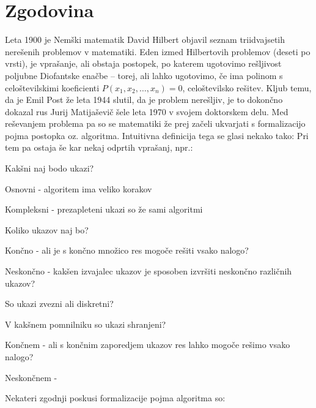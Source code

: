 \documentclass[10pt,a4paper,oneside]{book}
\begin{document}
\section{Zgodovina}
Leta 1900 je Nemški matematik David Hilbert objavil seznam triidvajsetih nerešenih problemov v matematiki. Eden izmed Hilbertovih problemov (deseti po vrsti), je vprašanje, ali obstaja postopek, po katerem ugotovimo rešljivost poljubne Diofantske enačbe -- torej, ali lahko ugotovimo, če ima polinom s celoštevilskimi koeficienti $P(x_1, x_2, \dots, x_n)=0$, celoštevilsko rešitev.
Kljub temu, da je Emil Post že leta 1944 slutil, da je problem nerešljiv, je to dokončno dokazal rus Jurij Matijaševič šele leta 1970 v svojem doktorskem delu. Med reševanjem problema pa so se matematiki že prej začeli ukvarjati s formalizacijo pojma postopka oz. algoritma. Intuitivna definicija tega se glasi nekako tako:
Pri tem pa ostaja še kar nekaj odprtih vprašanj, npr.:
\begin{items}
\item Kakšni naj bodo ukazi? 
	\begin{items}
	\item Osnovni - algoritem ima veliko korakov
	\item Kompleksni - prezapleteni ukazi so že sami algoritmi
	\end{items}
\item Koliko ukazov naj bo?
	\begin{items}
	\item Končno - ali je s končno množico res mogoče rešiti vsako nalogo?
	\item Neskončno - kakšen izvajalec ukazov je sposoben izvršiti neskončno različnih ukazov?
	\end{items}
\item So ukazi zvezni ali diskretni?
\item V kakšnem pomnilniku so ukazi shranjeni?
	\begin{items}%
	\item Končnem - ali s končnim zaporedjem ukazov res lahko mogoče rešimo vsako nalogo?
	\item Neskončnem - %
	\end{items}
\end{items}
Nekateri zgodnji poskusi formalizacije pojma algoritma so:%
\end{document}
